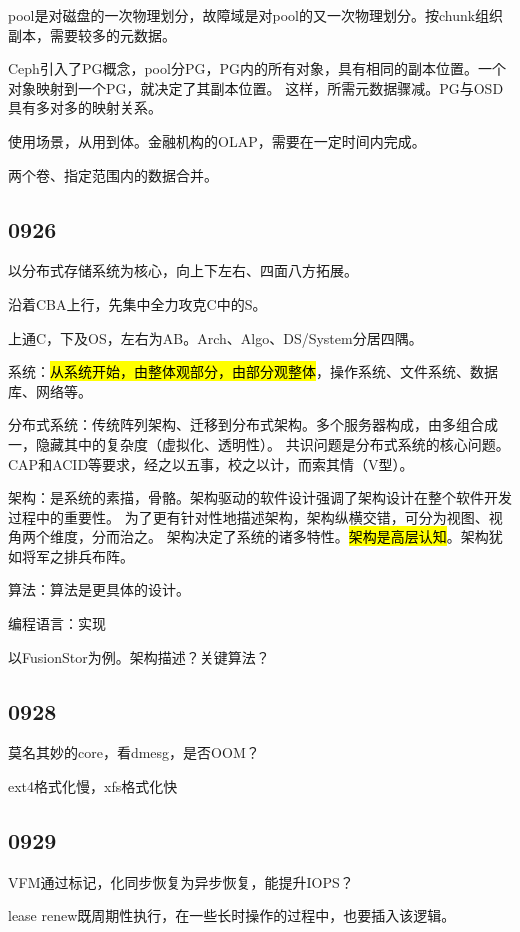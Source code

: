 pool是对磁盘的一次物理划分，故障域是对pool的又一次物理划分。按chunk组织副本，需要较多的元数据。

Ceph引入了PG概念，pool分PG，PG内的所有对象，具有相同的副本位置。一个对象映射到一个PG，就决定了其副本位置。
这样，所需元数据骤减。PG与OSD具有多对多的映射关系。

使用场景，从用到体。金融机构的OLAP，需要在一定时间内完成。

两个卷、指定范围内的数据合并。

\subsection{0926}

以分布式存储系统为核心，向上下左右、四面八方拓展。

沿着CBA上行，先集中全力攻克C中的S。

上通C，下及OS，左右为AB。Arch、Algo、DS/System分居四隅。

系统：\hl{从系统开始，由整体观部分，由部分观整体}，操作系统、文件系统、数据库、网络等。

分布式系统：传统阵列架构、迁移到分布式架构。多个服务器构成，由多组合成一，隐藏其中的复杂度（虚拟化、透明性）。
共识问题是分布式系统的核心问题。CAP和ACID等要求，经之以五事，校之以计，而索其情（V型）。

架构：是系统的素描，骨骼。架构驱动的软件设计强调了架构设计在整个软件开发过程中的重要性。
为了更有针对性地描述架构，架构纵横交错，可分为视图、视角两个维度，分而治之。
架构决定了系统的诸多特性。\hl{架构是高层认知}。架构犹如将军之排兵布阵。

算法：算法是更具体的设计。

编程语言：实现

以FusionStor为例。架构描述？关键算法？

\subsection{0928}

莫名其妙的core，看dmesg，是否OOM？

ext4格式化慢，xfs格式化快

\subsection{0929}

VFM通过标记，化同步恢复为异步恢复，能提升IOPS？

lease renew既周期性执行，在一些长时操作的过程中，也要插入该逻辑。


